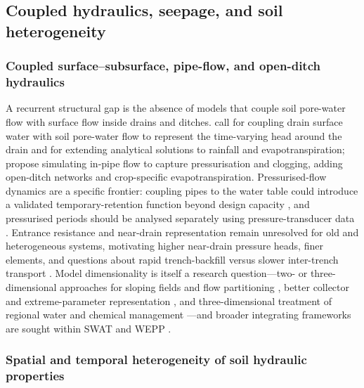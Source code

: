\subsection{Coupled hydraulics, seepage, and soil heterogeneity}

\subsubsection{Coupled surface--subsurface, pipe-flow, and open-ditch hydraulics}

A recurrent structural gap is the absence of models that couple soil pore-water
flow with surface flow inside drains and ditches. \textcite{Xin2016b} call for
coupling drain surface water with soil pore-water flow to represent the
time-varying head around the drain and for extending analytical solutions to
rainfall and evapotranspiration; \textcite{Nousiainen2015} propose simulating
in-pipe flow to capture pressurisation and clogging, adding open-ditch networks
and crop-specific evapotranspiration. Pressurised-flow dynamics are a specific
frontier: coupling pipes to the water table could introduce a validated
temporary-retention function beyond design capacity
\parencite{Henine2010,Henine2014}, and pressurised periods should be analysed
separately using pressure-transducer data \parencite{Saadat2018}. Entrance
resistance and near-drain representation remain unresolved for old and
heterogeneous systems, motivating higher near-drain pressure heads, finer
elements, and questions about rapid trench-backfill versus slower inter-trench
transport \parencite{Messing2006,Rimidis2003}. Model dimensionality is itself a
research question---two- or three-dimensional approaches for sloping fields and
flow partitioning \parencite{Alakukku2010,FIPPS1989}, better collector and
extreme-parameter representation \parencite{Carlier2007}, and three-dimensional
treatment of regional water and chemical management
\parencite{Mohanty1998}---and broader integrating frameworks are sought within
SWAT and WEPP \parencite{Manguerra1998,SAVABI1993,RevueltaAcosta2021}.

\subsubsection{Spatial and temporal heterogeneity of soil hydraulic properties}

